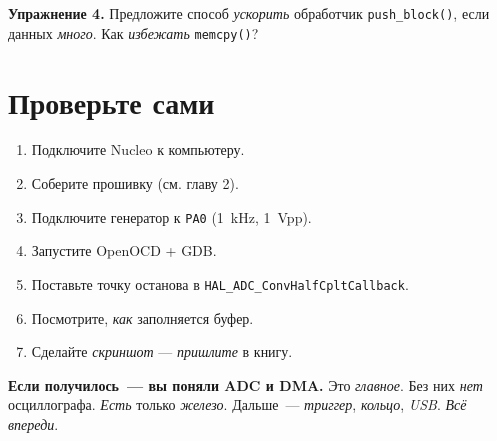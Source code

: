 \begin{exercisebox}
\textbf{Упражнение 4.} Предложите способ \emph{ускорить}
обработчик \texttt{push\_block()}, если данных \emph{много}.
Как \emph{избежать} \texttt{memcpy()}?
\end{exercisebox}

\section{Проверьте сами}
\label{sec:adc-check}

\begin{enumerate}
    \item Подключите Nucleo к компьютеру.
    \item Соберите прошивку (см. главу 2).
    \item Подключите генератор к \texttt{PA0} (\SI{1}{\kilo\hertz},
          \SI{1}{\volt}pp).
    \item Запустите OpenOCD + GDB.
    \item Поставьте точку останова в \texttt{HAL\_ADC\_ConvHalfCpltCallback}.
    \item Посмотрите, \emph{как} заполняется буфер.
    \item Сделайте \emph{скриншот} — \emph{пришлите} в книгу.
\end{enumerate}

\begin{ideabox}
\textbf{Если получилось~--- вы поняли ADC и DMA.} Это
\emph{главное}. Без них \emph{нет} осциллографа. \emph{Есть}
только \emph{железо}. Дальше~--- \emph{триггер},
\emph{кольцо}, \emph{USB}. \emph{Всё} \emph{впереди}.
\end{ideabox}




